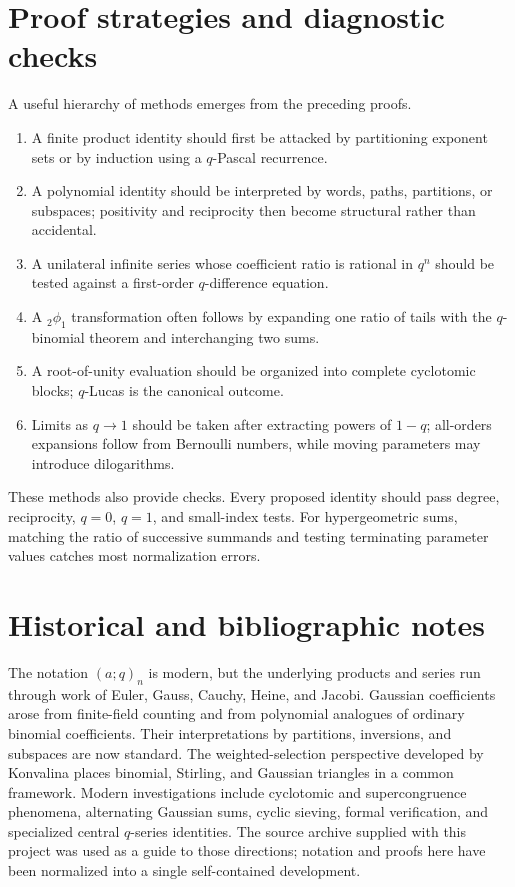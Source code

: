\documentclass[11pt]{article}
\numberwithin{equation}{section}
\theoremstyle{definition}
\begin{document}
\section{Proof strategies and diagnostic checks}
A useful hierarchy of methods emerges from the preceding proofs.
\begin{enumerate}[label=\arabic*.]
\item A finite product identity should first be attacked by partitioning exponent sets or by induction using a $q$-Pascal recurrence.
\item A polynomial identity should be interpreted by words, paths, partitions, or subspaces; positivity and reciprocity then become structural rather than accidental.
\item A unilateral infinite series whose coefficient ratio is rational in $q^n$ should be tested against a first-order $q$-difference equation.
\item A ${}_2\phi_1$ transformation often follows by expanding one ratio of tails with the $q$-binomial theorem and interchanging two sums.
\item A root-of-unity evaluation should be organized into complete cyclotomic blocks; $q$-Lucas is the canonical outcome.
\item Limits as $q\to1$ should be taken after extracting powers of $1-q$; all-orders expansions follow from Bernoulli numbers, while moving parameters may introduce dilogarithms.
\end{enumerate}
These methods also provide checks.  Every proposed identity should pass degree, reciprocity, $q=0$, $q=1$, and small-index tests.  For hypergeometric sums, matching the ratio of successive summands and testing terminating parameter values catches most normalization errors.

\section{Historical and bibliographic notes}
The notation $(a;q)_n$ is modern, but the underlying products and series run through work of Euler, Gauss, Cauchy, Heine, and Jacobi.  Gaussian coefficients arose from finite-field counting and from polynomial analogues of ordinary binomial coefficients.  Their interpretations by partitions, inversions, and subspaces are now standard.  The weighted-selection perspective developed by Konvalina places binomial, Stirling, and Gaussian triangles in a common framework.  Modern investigations include cyclotomic and supercongruence phenomena, alternating Gaussian sums, cyclic sieving, formal verification, and specialized central $q$-series identities.  The source archive supplied with this project was used as a guide to those directions; notation and proofs here have been normalized into a single self-contained development.
\end{document}

